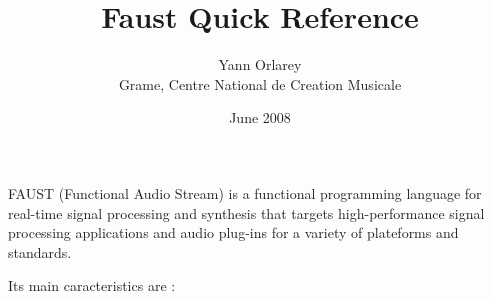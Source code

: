 \documentclass{article}
\begin{document}


\title{Faust Quick Reference}
\author{Yann Orlarey\\Grame, Centre National de Creation Musicale}
\date{June 2008}



\newcommand{\farg}[1]{\textrm{\textit{#1}}}
\newcommand{\ldbrack}{[\![ \,}
\newcommand{\rdbrack}{\, ]\!] }
\newcommand{\rdbrackC}{\rdbrack_{\mathrm{C}}\,}
\newcommand{\dbrack}[1]{\ldbrack #1 \rdbrack}
\newcommand{\semantic}[1]{\ldbrack #1 \rdbrack}
\newcommand{\dbrackC}[1]{\ldbrack #1 \rdbrackC}

\setlength{\parindent}{0pt}
\setlength{\parskip}{1ex plus 0.5ex minus 0.2ex}

\maketitle

FAUST (Functional Audio Stream) is a functional programming language for real-time signal processing and synthesis that targets high-performance signal processing applications and audio plug-ins for a variety of plateforms and standards. 

Its main caracteristics are :
\end{document}
